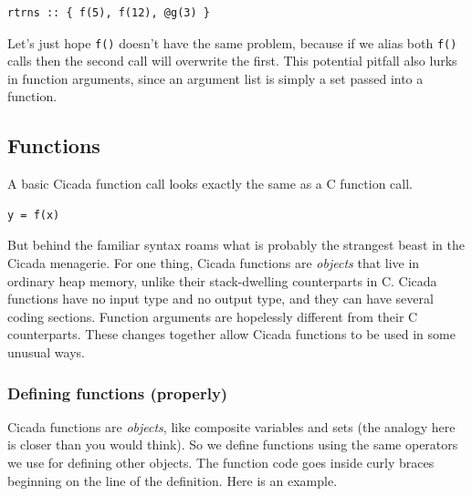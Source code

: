 \documentclass{article}
\newenvironment{code}{
       \begin{list}{}{
               \setlength{\leftmargin}{.4in}
               \setlength{\rightmargin}{0in}
               \setlength{\topsep}{.2in}
       }
       \small
       \item[] }
       { \end{list}   }
\begin{document}
\begin{code} \begin{verbatim}
rtrns :: { f(5), f(12), @g(3) }
\end{verbatim} \end{code}

\noindent Let's just hope \verb#f()# doesn't have the same problem, because if we alias both \verb#f()# calls then the second call will overwrite the first.  This potential pitfall also lurks in function arguments, since an argument list is simply a set passed into a function.









\subsection{Functions} 

A basic Cicada function call looks exactly the same as a C function call.

\begin{code} \begin{verbatim}
y = f(x)
\end{verbatim} \end{code}

\noindent But behind the familiar syntax roams what is probably the strangest beast in the Cicada menagerie.  For one thing, Cicada functions are \emph{objects} that live in ordinary heap memory, unlike their stack-dwelling counterparts in C.  Cicada functions have no input type and no output type, and they can have several coding sections.  Function arguments are hopelessly different from their C counterparts.  These changes together allow Cicada functions to be used in some unusual ways.




\subsubsection{Defining functions (properly)}

Cicada functions are \emph{objects}, like composite variables and sets (the analogy here is closer than you would think).  So we define functions using the same operators we use for defining other objects.  The function code goes inside curly braces beginning on the line of the definition.  Here is an example.
\end{document}
